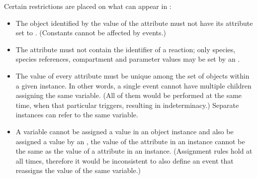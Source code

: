 Certain restrictions are placed on what can appear in
:
\begin{itemize}
  
\item The object identified by the value of the 
  attribute must not have its  attribute set 
  to .  (Constants cannot be affected by events.)
  
\item The  attribute must not contain the
  identifier of a reaction;  only species, species references,
  compartment and parameter values may be set by an \Event.
  
\item The value of every  attribute must be unique
  among the set of \EventAssignment objects within a given
  \Event instance.  In other words, a single event cannot have
  multiple \EventAssignment children assigning the same variable.  (All
  of them would be performed at the same time, when that
  particular \Event triggers, resulting in indeterminacy.)
  Separate \Event instances can refer to the same variable.
  
\item A variable cannot be assigned a value in an \EventAssignment
  object instance and also be assigned a value by an
  \AssignmentRule, \ie the value of the  attribute
  in an \EventAssignment instance cannot be the same as the value
  of a  attribute in an \AssignmentRule instance.
  (Assignment rules hold at all times, therefore it would be
  inconsistent to also define an event that reassigns the value of
  the same variable.)


\end{itemize}

